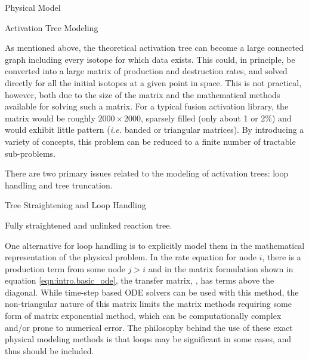 \begin{chapter}{Physical Model\label{chap:physical}}
\begin{section}{Activation Tree Modeling\label{sec:physical.chains}}
  
  As mentioned above, the theoretical activation tree can become a
  large connected graph including every isotope for which data exists.
  This could, in principle, be converted into a large matrix of
  production and destruction rates, and solved directly for all the
  initial isotopes at a given point in space.  This is not practical,
  however, both due to the size of the matrix and the mathematical
  methods available for solving such a matrix.  For a typical fusion
  activation library, the matrix would be roughly $2000 \times 2000$,
  sparsely filled (only about 1 or 2\%) and would exhibit little
  pattern (\textsl{i.e.} banded or triangular matrices).  By
  introducing a variety of concepts, this problem can be reduced to a
  finite number of tractable sub-problems.  
  
  There are two primary issues related to the modeling of activation
  trees: loop handling and tree truncation.
  
  \begin{subsection}{Tree Straightening and Loop Handling\label{sec:physical.chains.loops}}
    
    \begin{floatingfigure}{0.55\columnwidth}
      \begin{center}
        \caption{Fully straightened and unlinked reaction
          tree.}\label{fig:physical.straight_tree}
      \end{center}
    \end{floatingfigure}
    
    \noindent One alternative for loop handling is to explicitly model them in
    the mathematical representation of the physical problem.  In the
    rate equation for node $i$, there is a production term from some
    node $j>i$ and in the matrix formulation shown in equation
    \ref{eqn:intro.basic_ode}, the transfer matrix, , has terms
    above the diagonal.  While time-step based ODE solvers can be used
    with this method\cite{FISPACT}, the non-triangular nature of this
    matrix limits the matrix methods requiring some form of matrix
    exponential method\cite{RACCP}, which can be computationally
    complex and/or prone to numerical error.  The philosophy behind
    the use of these exact physical modeling methods is that loops may
    be significant in some cases, and thus should be included.
    

\end{subsection}
\end{section}
\end{chapter}
